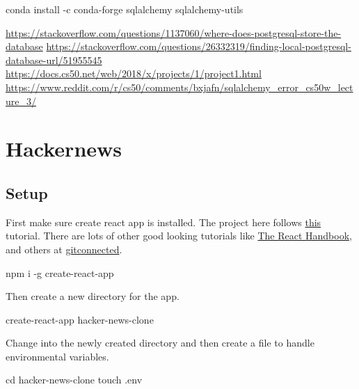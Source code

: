 \documentclass[]{book}
\newenvironment{Shaded}{\begin{snugshade}}{\end{snugshade}}
\newcommand{\FunctionTok}[1]{\textcolor[rgb]{0.00,0.00,0.00}{#1}}
\newcommand{\BuiltInTok}[1]{#1}
\newcommand{\ExtensionTok}[1]{#1}
\newcommand{\NormalTok}[1]{#1}
\begin{document}
\begin{Shaded}
\begin{Highlighting}[]
\ExtensionTok{conda}\NormalTok{ install -c conda-forge sqlalchemy sqlalchemy-utils}
\end{Highlighting}
\end{Shaded}

\url{https://stackoverflow.com/questions/1137060/where-does-postgresql-store-the-database}
\url{https://stackoverflow.com/questions/26332319/finding-local-postgresql-database-url/51955545}
\url{https://docs.cs50.net/web/2018/x/projects/1/project1.html}
\url{https://www.reddit.com/r/cs50/comments/bxjafn/sqlalchemy_error_cs50w_lecture_3/}

\chapter{Hackernews}\label{hackernews}

\section{Setup}\label{setup-1}

First make sure create react app is installed. The project here follows
\href{https://www.youtube.com/watch?v=oGB_VPrld0U\&list=PLTTC1K14KAxHj6AftnRUD28SQaoVauvl3}{this}
tutorial. There are lots of other good looking tutorials like
\href{https://www.freecodecamp.org/news/the-react-handbook-b71c27b0a795/}{The
React Handbook}, and others at
\href{https://gitconnected.com/learn/react}{gitconnected}.

\begin{Shaded}
\begin{Highlighting}[]
\ExtensionTok{npm}\NormalTok{ i -g create-react-app}
\end{Highlighting}
\end{Shaded}

Then create a new directory for the app.

\begin{Shaded}
\begin{Highlighting}[]
\ExtensionTok{create-react-app}\NormalTok{ hacker-news-clone}
\end{Highlighting}
\end{Shaded}

Change into the newly created directory and then create a file to handle
environmental variables.

\begin{Shaded}
\begin{Highlighting}[]
\BuiltInTok{cd}\NormalTok{ hacker-news-clone}
\FunctionTok{touch}\NormalTok{ .env}
\end{Highlighting}
\end{Shaded}
\end{document}
